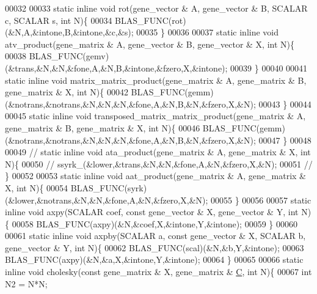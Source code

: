 \begin{DoxyCode}
00032 
00033   \textcolor{keyword}{static} \textcolor{keyword}{inline} \textcolor{keywordtype}{void} rot(gene\_vector & A,  gene\_vector & B, SCALAR c, SCALAR s, \textcolor{keywordtype}{int} N)\{
00034     BLAS\_FUNC(rot)(&N,A,&intone,B,&intone,&c,&s);
00035   \}
00036 
00037   \textcolor{keyword}{static} \textcolor{keyword}{inline} \textcolor{keywordtype}{void} atv\_product(gene\_matrix & A, gene\_vector & B, gene\_vector & X, \textcolor{keywordtype}{int} N)\{
00038     BLAS\_FUNC(gemv)(&trans,&N,&N,&fone,A,&N,B,&intone,&fzero,X,&intone);
00039   \}
00040 
00041   \textcolor{keyword}{static} \textcolor{keyword}{inline} \textcolor{keywordtype}{void} matrix\_matrix\_product(gene\_matrix & A, gene\_matrix & B, gene\_matrix & X, \textcolor{keywordtype}{int} N)\{
00042     BLAS\_FUNC(gemm)(&notrans,&notrans,&N,&N,&N,&fone,A,&N,B,&N,&fzero,X,&N);
00043   \}
00044 
00045   \textcolor{keyword}{static} \textcolor{keyword}{inline} \textcolor{keywordtype}{void} transposed\_matrix\_matrix\_product(gene\_matrix & A, gene\_matrix & B, gene\_matrix & X, \textcolor{keywordtype}{
      int} N)\{
00046     BLAS\_FUNC(gemm)(&notrans,&notrans,&N,&N,&N,&fone,A,&N,B,&N,&fzero,X,&N);
00047   \}
00048 
00049 \textcolor{comment}{//   static inline void ata\_product(gene\_matrix & A, gene\_matrix & X, int N)\{}
00050 \textcolor{comment}{//     ssyrk\_(&lower,&trans,&N,&N,&fone,A,&N,&fzero,X,&N);}
00051 \textcolor{comment}{//   \}}
00052 
00053   \textcolor{keyword}{static} \textcolor{keyword}{inline} \textcolor{keywordtype}{void} aat\_product(gene\_matrix & A, gene\_matrix & X, \textcolor{keywordtype}{int} N)\{
00054     BLAS\_FUNC(syrk)(&lower,&notrans,&N,&N,&fone,A,&N,&fzero,X,&N);
00055   \}
00056 
00057   \textcolor{keyword}{static} \textcolor{keyword}{inline} \textcolor{keywordtype}{void} axpy(SCALAR coef, \textcolor{keyword}{const} gene\_vector & X, gene\_vector & Y, \textcolor{keywordtype}{int} N)\{
00058     BLAS\_FUNC(axpy)(&N,&coef,X,&intone,Y,&intone);
00059   \}
00060 
00061   \textcolor{keyword}{static} \textcolor{keyword}{inline} \textcolor{keywordtype}{void} axpby(SCALAR a, \textcolor{keyword}{const} gene\_vector & X, SCALAR b, gene\_vector & Y, \textcolor{keywordtype}{int} N)\{
00062     BLAS\_FUNC(scal)(&N,&b,Y,&intone);
00063     BLAS\_FUNC(axpy)(&N,&a,X,&intone,Y,&intone);
00064   \}
00065 
00066   \textcolor{keyword}{static} \textcolor{keyword}{inline} \textcolor{keywordtype}{void} cholesky(\textcolor{keyword}{const} gene\_matrix & X, gene\_matrix & \hyperlink{group___core___module}{C}, \textcolor{keywordtype}{int} N)\{
00067     \textcolor{keywordtype}{int} N2 = N*N;

\end{DoxyCode}
